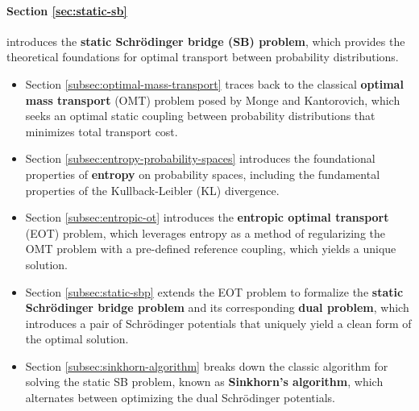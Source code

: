 \documentclass{article}
\begin{document}
\paragraph{Section \ref{sec:static-sb}} introduces the \textbf{static Schrödinger bridge (SB) problem}, which provides the theoretical foundations for optimal transport between probability distributions.
\begin{itemize}
    \item Section \ref{subsec:optimal-mass-transport} traces back to the classical \textbf{optimal mass transport} (OMT) problem posed by Monge and Kantorovich, which seeks an optimal static coupling between probability distributions that minimizes total transport cost. 
    \item Section \ref{subsec:entropy-probability-spaces} introduces the foundational properties of \textbf{entropy} on probability spaces, including the fundamental properties of the Kullback-Leibler (KL) divergence.
    \item Section \ref{subsec:entropic-ot} introduces the \textbf{entropic optimal transport} (EOT) problem, which leverages entropy as a method of regularizing the OMT problem with a pre-defined reference coupling, which yields a unique solution.
    \item Section \ref{subsec:static-sbp} extends the EOT problem to formalize the \textbf{static Schrödinger bridge problem} and its corresponding \textbf{dual problem}, which introduces a pair of Schrödinger potentials that uniquely yield a clean form of the optimal solution. 
    \item Section \ref{subsec:sinkhorn-algorithm} breaks down the classic algorithm for solving the static SB problem, known as \textbf{Sinkhorn's algorithm}, which alternates between optimizing the dual Schrödinger potentials.
\end{itemize}
\end{document}
